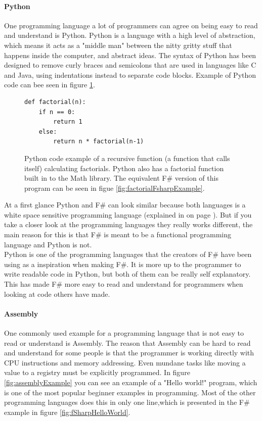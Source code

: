 \documentclass[12pt, a4paper]{article}
\begin{document}
\newpage
\paragraph{Python}

One programming language a lot of programmers can agree on being easy to read and understand is Python. Python is a language with a high level of abstraction, which means it acts as a "middle man" between the nitty gritty stuff that happens inside the computer, and abstract ideas. The syntax of Python has been designed to remove curly braces and semicolons that are used in languages like C and Java, using indentations instead to separate code blocks. Example of Python code can bee seen in figure \ref{fig:pythonFactorial}.\\

\begin{figure}[!h]
	\begin{lstlisting}
def factorial(n):
    if n == 0:
        return 1
    else:
        return n * factorial(n-1)
	\end{lstlisting}
	\caption{Python code example of a recursive function (a function that calls itself) calculating factorials. Python also has a factorial function built in to the Math library. The equivalent F\# version of this program can be seen in figue \ref{fig:factorialFsharpExample}.}
	\label{fig:pythonFactorial}
\end{figure}

At a first glance Python and F\# can look similar because both languages is a white space sensitive programming language (explained in  on page \pageref{indentationAndCodeStructure}). But if you take a closer look at the programming languages they really works different, the main reason for this is that F\# is meant to be a functional programming language and Python is not.\\

Python is one of the programming languages that the creators of F\# have been using as a inspiration when making F\#. It is more up to the programmer to write readable code in Python, but both of them can be really self explanatory. This has made F\# more easy to read and understand for programmers when looking at code others have made.

\newpage
\paragraph{Assembly} One commonly used example for a programming language that is not easy to read or understand is Assembly. The reason that Assembly can be hard to read and understand for some people is that the programmer is working directly with CPU instructions and memory addressing. Even mundane tasks like moving a value to a registry must be explicitly programmed. In figure \ref{fig:assemblyExample} you can see an example of a "Hello world!" program, which is one of the most popular beginner examples in programming. Most of the other programming languages does this in only one line,which is presented in the F\# example in figure \ref{fig:fSharpHelloWorld}.\\
\end{document}
